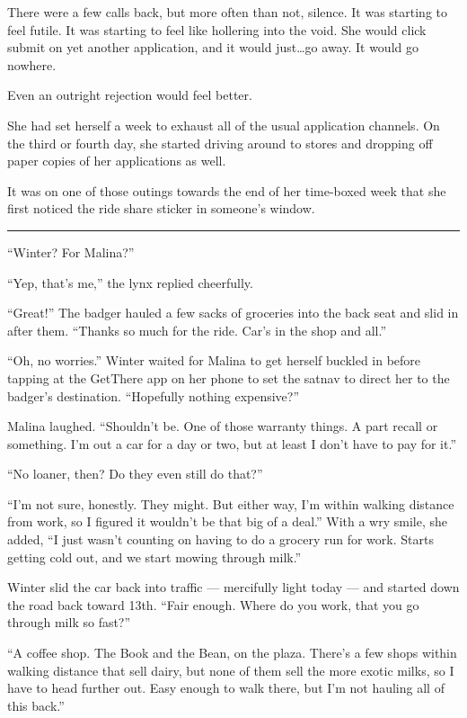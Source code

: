 There were a few calls back, but more often than not, silence. It was starting to feel futile. It was starting to feel like hollering into the void. She would click submit on yet another application, and it would just\ldots go away. It would go nowhere.

Even an outright rejection would feel better.

She had set herself a week to exhaust all of the usual application channels. On the third or fourth day, she started driving around to stores and dropping off paper copies of her applications as well.

It was on one of those outings towards the end of her time-boxed week that she first noticed the ride share sticker in someone's window.

\begin{center}\rule{0.5\linewidth}{0.5pt}\end{center}

``Winter? For Malina?''

``Yep, that's me,'' the lynx replied cheerfully.

``Great!'' The badger hauled a few sacks of groceries into the back seat and slid in after them. ``Thanks so much for the ride. Car's in the shop and all.''

``Oh, no worries.'' Winter waited for Malina to get herself buckled in before tapping at the GetThere app on her phone to set the satnav to direct her to the badger's destination. ``Hopefully nothing expensive?''

Malina laughed. ``Shouldn't be. One of those warranty things. A part recall or something. I'm out a car for a day or two, but at least I don't have to pay for it.''

``No loaner, then? Do they even still do that?''

``I'm not sure, honestly. They might. But either way, I'm within walking distance from work, so I figured it wouldn't be that big of a deal.'' With a wry smile, she added, ``I just wasn't counting on having to do a grocery run for work. Starts getting cold out, and we start mowing through milk.''

Winter slid the car back into traffic --- mercifully light today --- and started down the road back toward 13th. ``Fair enough. Where do you work, that you go through milk so fast?''

``A coffee shop. The Book and the Bean, on the plaza. There's a few shops within walking distance that sell dairy, but none of them sell the more exotic milks, so I have to head further out. Easy enough to walk there, but I'm not hauling all of this back.''


